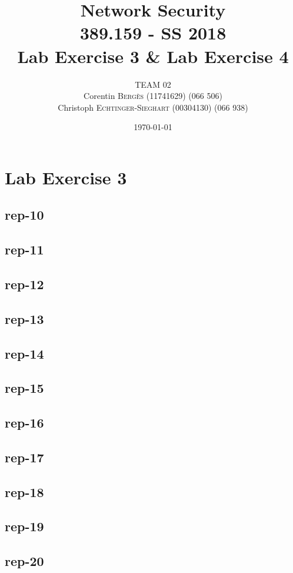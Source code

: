 \documentclass{article}
\title{Network Security \\ 389.159 - SS 2018 \\ Lab Exercise 3 \& Lab Exercise 4} %
\author{
    TEAM 02 \\
    Corentin \textsc{Bergès} (11741629) (066 506) \\
    Christoph \textsc{Echtinger-Sieghart} (00304130) (066 938)
}
\date{\today} %
\begin{document}
\maketitle %
\renewcommand{\arraystretch}{2} %

\section{Lab Exercise 3}

\subsection{rep-10}
\subsection{rep-11}
\subsection{rep-12}
\subsection{rep-13}
\subsection{rep-14}
\subsection{rep-15}
\subsection{rep-16}
\subsection{rep-17}
\subsection{rep-18}

\subsection{rep-19}

\subsection{rep-20}
\end{document}
